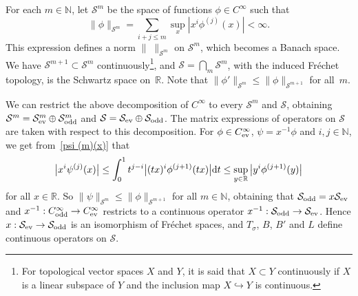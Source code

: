 \documentclass[pdftex]{sigma}
\newcommand{\R}{\mathbb{R}}
\newcommand{\N}{\mathbb{N}}
\renewcommand{\SS}{\mathcal{S}}
\newcommand{\Cinf}{C^\infty}
\begin{document}
For each $m\in\N$, let $\SS^m$ be the space of functions $\phi\in\Cinf$ such that
  \[
    \|\phi\|_{\SS^m}=\sum_{i+j\le m}\sup_x|x^i\phi^{(j)}(x)|<\infty .
  \]
This expression def\/ines a norm $\|\; \|_{\SS^m}$ on $\SS^m$, which becomes a Banach space. We have \mbox{$\SS^{m+1}\subset\SS^m$} continuously\footnote{For topological vector spaces $X$ and $Y$, it is said that $X\subset Y$ continuously if $X$ is a linear subspace of $Y$ and the inclusion map $X\hookrightarrow Y$ is continuous.}, and $\SS=\bigcap_m\SS^m$, with the induced Fr\'echet topology, is the Schwartz space on~$\R$. Note that $\|\phi'\|_{\SS^m}\le\|\phi\|_{\SS^{m+1}}$ for all~$m$.

We can restrict the above decomposition of $\Cinf$ to every $\SS^m$ and $\SS$,
obtaining $\SS^m=\SS^m_{\text{\rm ev}}\oplus\SS^m_{\text{\rm odd}}$ and $\SS=\SS_{\text{\rm ev}}\oplus\SS_{\text{\rm odd}}$. The matrix expressions of operators on $\SS$ are taken with respect to this decomposition. For $\phi\in \Cinf_{\text{\rm ev}}$, $\psi=x^{-1}\phi$ and $i,j\in\N$, we get from~\eqref{psi (m)(x)} that
  \[
    \big|x^i\psi^{(j)}(x)\big|\le\int_0^1t^{j-i}\big|(tx)^i\phi^{(j+1)}(tx)\big|{\rm d}t\le\sup_{y\in\R}\big|y^i\phi^{(j+1)}(y)\big|
  \]
for all $x\in\R$. So $\|\psi\|_{\SS^m}\le\|\phi\|_{\SS^{m+1}}$ for all $m\in\N$, obtaining that $\SS_{\text{\rm odd}}=x \SS_{\text{\rm ev}}$ and $x^{-1}:\Cinf_{\text{\rm odd}}\to \Cinf_{\text{\rm ev}}$ restricts to a continuous operator $x^{-1}:\SS_{\text{\rm odd}}\to\SS_{\text{\rm ev}}$. Hence $x:\SS_{\text{\rm ev}}\to\SS_{\text{\rm odd}}$ is an isomorphism of Fr\'echet spaces, and $T_\sigma$, $B$, $B'$ and $L$ def\/ine continuous operators on $\SS$.
\end{document}
